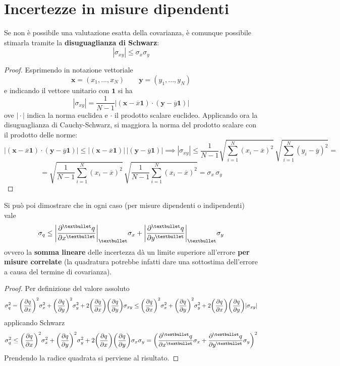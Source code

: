 \documentclass[10pt, oneside]{book}
\newcommand{\cov}{\sigma_{xy}}
\begin{document}
\section{Incertezze in misure dipendenti}
Se non è possibile una valutazione esatta della covarianza, è comunque possibile stimarla tramite la \textbf{disuguaglianza di Schwarz}:
\[|\cov| \leq \sigma_x \sigma_y\]
\begin{proof}
Esprimendo in notazione vettoriale
\[\mathbf{x} = (x_1, ..., x_N) \qquad \mathbf{y} = (y_1, ..., y_N)\]
e indicando il vettore unitario con $\mathbf{1}$ si ha
\[|\cov| = \frac{1}{N-1} \big|(\mathbf{x} - \overline{x} \mathbf{1}) \cdot (\mathbf{y} - \overline{y} \mathbf{1})\big|\]
ove $\big| \cdot \big|$ indica la norma euclidea e $\cdot$ il prodotto scalare euclideo. Applicando ora la disuguaglianza di Cauchy-Schwarz, si maggiora la norma del prodotto scalare con il prodotto delle norme:
\[\big|(\mathbf{x} - \overline{x} \mathbf{1}) \cdot (\mathbf{y} - \overline{y} \mathbf{1})\big| \leq |(\mathbf{x} - \overline{x} \mathbf{1})| \, |(\mathbf{y} - \overline{y} \mathbf{1})| \implies |\cov| \leq \frac{1}{N-1} \sqrt{\sum\limits_{i=1}^N (x_i - \overline{x})^2} \, \sqrt{\sum\limits_{i=1}^N (y_i - \overline{y})^2} =\]
\[= \sqrt{\frac{1}{N-1}\sum\limits_{i=1}^N (x_i - \overline{x})^2}\, \sqrt{\frac{1}{N-1}\sum\limits_{i=1}^N (x_i - \overline{x})^2} = \sigma_x \, \sigma_y\]
\end{proof}
Si può poi dimostrare che in ogni caso (per misure dipendenti o indipendenti) vale
\[\sigma_q \leq \bigg|\pdv[•]{q}{x}\bigg|_{•} \sigma_x + \bigg|\pdv[•]{q}{y}\bigg|_{•} \sigma_y\]
ovvero la \textbf{somma lineare} delle incertezza dà un limite superiore all'errore \textbf{per misure correlate} (la quadratura potrebbe infatti dare una sottostima dell'errore a causa del termine di covarianza).
\begin{proof}
Per definizione del valore assoluto
\[\sigma_q^2 = \bigg(\pdv{q}{x}\bigg)^2 \sigma_x^2 + \bigg(\pdv{q}{y}\bigg)^2 \sigma_y^2 + 2 \bigg(\pdv{q}{x}\bigg) \bigg(\pdv{q}{y}\bigg) \cov \leq \bigg(\pdv{q}{x}\bigg)^2 \sigma_x^2 + \bigg(\pdv{q}{y}\bigg)^2 \sigma_y^2 + 2 \bigg(\pdv{q}{x}\bigg) \bigg(\pdv{q}{y}\bigg) |\cov|\]
applicando Schwarz
\[\sigma_q^2 \leq \bigg(\pdv{q}{x}\bigg)^2 \sigma_x^2 + \bigg(\pdv{q}{y}\bigg)^2 \sigma_y^2 + 2 \bigg(\pdv{q}{x}\bigg) \bigg(\pdv{q}{y}\bigg) \sigma_x \sigma_y = \bigg(\pdv[•]{q}{x} \sigma_x + \pdv[•]{q}{y} \sigma_y\bigg)^2\]
Prendendo la radice quadrata si perviene al risultato.
\end{proof}
\end{document}
